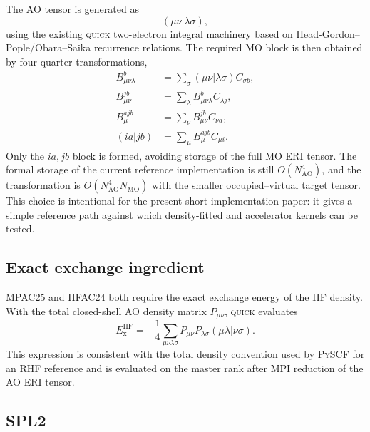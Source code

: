 \documentclass[aip,jcp,reprint,superscriptaddress]{revtex4-2}
\newcommand{\quick}{\textsc{quick}}
\newcommand{\pyscf}{\textsc{PySCF}}
\newcommand{\ExHF}{E_{\mathrm{x}}^{\mathrm{HF}}}
\begin{document}
The AO tensor is generated as
\begin{equation}
  (\mu\nu|\lambda\sigma),
\end{equation}
using the existing \quick{} two-electron integral machinery based on Head-Gordon--Pople/Obara--Saika recurrence relations.\cite{Obara1986,HeadGordon1988}  The required MO block is then obtained by four quarter transformations,
\begin{align}
  B_{\mu\nu\lambda}^{b}
  &= \sum_\sigma (\mu\nu|\lambda\sigma)C_{\sigma b},\\
  B_{\mu\nu}^{jb}
  &= \sum_\lambda B_{\mu\nu\lambda}^{b}C_{\lambda j},\\
  B_{\mu}^{ajb}
  &= \sum_\nu B_{\mu\nu}^{jb}C_{\nu a},\\
  (ia|jb)
  &= \sum_\mu B_{\mu}^{ajb}C_{\mu i}.
\end{align}
Only the \(ia,jb\) block is formed, avoiding storage of the full MO ERI tensor.  The formal storage of the current reference implementation is still \(O(N_{\mathrm{AO}}^4)\), and the transformation is \(O(N_{\mathrm{AO}}^4N_{\mathrm{MO}})\) with the smaller occupied--virtual target tensor.  This choice is intentional for the present short implementation paper: it gives a simple reference path against which density-fitted and accelerator kernels can be tested.

\subsection{Exact exchange ingredient}

MPAC25 and HFAC24 both require the exact exchange energy of the HF density.  With the total closed-shell AO density matrix \(P_{\mu\nu}\), \quick{} evaluates
\begin{equation}
  \ExHF
  =
  -\frac{1}{4}
  \sum_{\mu\nu\lambda\sigma}
  P_{\mu\nu}P_{\lambda\sigma}
  (\mu\lambda|\nu\sigma).
  \label{eq:exact_exchange}
\end{equation}
This expression is consistent with the total density convention used by \pyscf{} for an RHF reference and is evaluated on the master rank after MPI reduction of the AO ERI tensor.

\subsection{SPL2}
\end{document}
